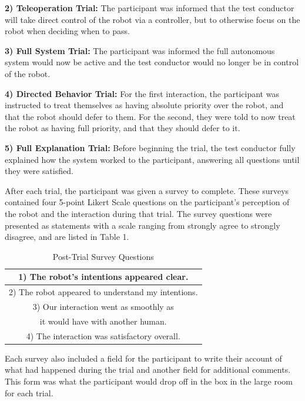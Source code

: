 \documentclass[letterpaper, 10 pt, conference]{ieeeconf}  %
\begin{document}
\textbf{2) Teleoperation Trial:} The participant was informed that the test conductor will take direct control of the robot via a controller, but to otherwise focus on the robot when deciding when to pass. 

\textbf{3) Full System Trial:} The participant was informed the full autonomous system would now be active and the test conductor would no longer be in control of the robot.

\textbf{4) Directed Behavior Trial:} For the first interaction, the participant was instructed to treat themselves as having absolute priority over the robot, and that the robot should defer to them. For the second, they were told to now treat the robot as having full priority, and that they should defer to it.

\textbf{5) Full Explanation Trial:} Before beginning the trial, the test conductor fully explained how the system worked to the participant, answering all questions until they were satisfied.

After each trial, the participant was given a survey to complete. These surveys contained four 5-point Likert Scale questions on the participant’s perception of the robot and the interaction during that trial. The survey questions were presented as statements with a scale ranging from strongly agree to strongly disagree, and are listed in Table 1.

\begin{table}[h]
\caption{Post-Trial Survey Questions}
\label{survey_questions}
\begin{center}
\begin{tabular}{|c|}
\hline
1) The robot’s intentions appeared clear.\\
\hline
2) The robot appeared to understand my intentions.\\
\hline
3) Our interaction went as smoothly as \\
it would have with another human.\\
\hline
4) The interaction was satisfactory overall.\\
\hline
\end{tabular}
\end{center}
\end{table}

Each survey also included a field for the participant to write their account of what had happened during the trial and another field for additional comments. This form was what the participant would drop off in the box in the large room for each trial.
\end{document}
